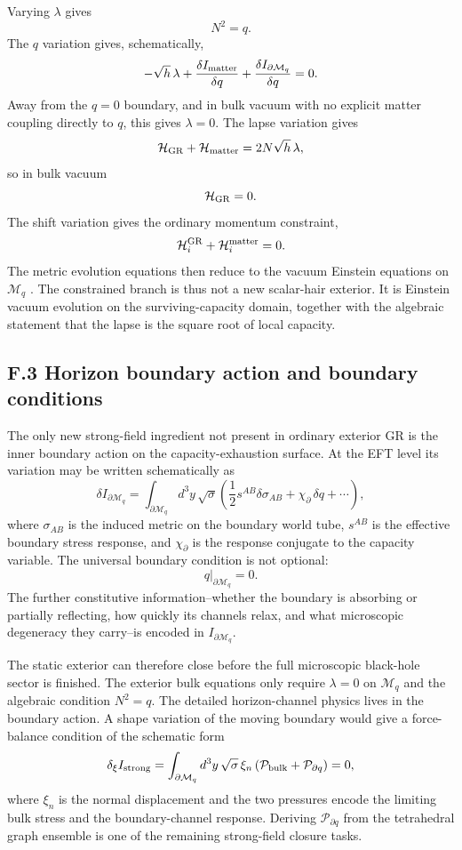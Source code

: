 \documentclass[11pt]{article}
\begin{document}
Varying $\lambda$ gives
\[
N^2=q.
\]
The $q$ variation gives, schematically,
\[
-\sqrt h\,\lambda
+
\frac{\delta I_{\rm matter}}{\delta q}
+
\frac{\delta I_{\partial\mathcal{M}_q}}{\delta q}
=0.
\]
Away from the $q=0$ boundary, and in bulk vacuum with no explicit matter coupling directly to $q$, this gives $\lambda=0$. The lapse variation gives
\[
\mathcal H_{\rm GR}+\mathcal H_{\rm matter}
=
2N\sqrt h\,\lambda,
\]
so in bulk vacuum
\[
\mathcal H_{\rm GR}=0.
\]
The shift variation gives the ordinary momentum constraint,
\[
\mathcal H^{\rm GR}_i+\mathcal H^{\rm matter}_i=0.
\]
The metric evolution equations then reduce to the vacuum Einstein equations on $\mathcal{M}_q$ \citep{ADM1962}. The constrained branch is thus not a new scalar-hair exterior. It is Einstein vacuum evolution on the surviving-capacity domain, together with the algebraic statement that the lapse is the square root of local capacity.

\subsection*{F.3 Horizon boundary action and boundary conditions}

The only new strong-field ingredient not present in ordinary exterior GR is the inner boundary action on the capacity-exhaustion surface. At the EFT level its variation may be written schematically as
\[
\delta I_{\partial\mathcal{M}_q}
=
\int_{\partial\mathcal{M}_q}d^3y\,\sqrt\sigma
\left(
\frac12 s^{AB}\delta\sigma_{AB}
+\chi_{\partial}\,\delta q
+\cdots
\right),
\]
where $\sigma_{AB}$ is the induced metric on the boundary world tube, $s^{AB}$ is the effective boundary stress response, and $\chi_{\partial}$ is the response conjugate to the capacity variable. The universal boundary condition is not optional:
\[
q\big|_{\partial\mathcal{M}_q}=0.
\]
The further constitutive information--whether the boundary is absorbing or partially reflecting, how quickly its channels relax, and what microscopic degeneracy they carry--is encoded in $I_{\partial\mathcal{M}_q}$.

The static exterior can therefore close before the full microscopic black-hole sector is finished. The exterior bulk equations only require $\lambda=0$ on $\mathcal{M}_q$ and the algebraic condition $N^2=q$. The detailed horizon-channel physics lives in the boundary action. A shape variation of the moving boundary would give a force-balance condition of the schematic form
\[
\delta_\xi I_{\rm strong}
=
\int_{\partial\mathcal{M}_q}d^3y\,\sqrt\sigma\,
\xi_n\left(\mathcal P_{\rm bulk}+\mathcal P_{\partial q}\right)=0,
\]
where $\xi_n$ is the normal displacement and the two pressures encode the limiting bulk stress and the boundary-channel response. Deriving $\mathcal P_{\partial q}$ from the tetrahedral graph ensemble is one of the remaining strong-field closure tasks.
\end{document}
